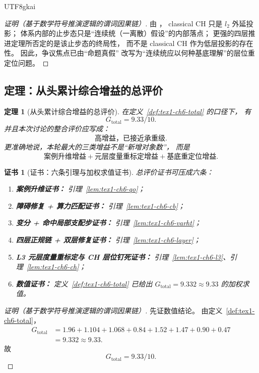 \documentclass[12pt]{article}
\newtheorem{theorem}{定理}[section]
\newtheorem{Certificate}{证书}[section]
\begin{document}
\begin{CJK*}{UTF8}{gkai}
\begin{proof}[证明（基于数学符号推演逻辑的谓词因果链）]
由 \cite{RepoTex41HomotopyRepairBundle}，
classical CH 只是 \(l_2\) 外延投影；
体系内部的止步态只是“连续统（一离散）假设”的内部落点；
更强的四层推进定理所否定的是该止步态的终局性，
而不是 classical CH 作为低层投影的存在性。
因此，争议焦点已由“命题真假”
改写为“连续统应以何种基底理解”的层位重定位问题。
\end{proof}

\subsection{定理：从头累计综合增益的总评价}
\label{subsec:tex1-ch6-theorem}

\begin{theorem}[从头累计综合增益的总评价]
\label{thm:tex1-ch6-total}
在定义~\ref{def:tex1-ch6-total} 的口径下，
有
\[
  \boxed{G_{\mathrm{total}}=9.33/10}.
\]
并且本次讨论的整合评价应写成：
\[
  \boxed{\text{高增益，已接近承重级}.}
\]
更准确地说，本轮最大的三类增益不是“新增对象数”，
而是
\[
  \boxed{
    \text{案例升维增益}
    +
    \text{元层度量重标定增益}
    +
    \text{基底重定位增益}
  }.
\]
\end{theorem}

\begin{Certificate}[证书：六条引理与加权求值证书]
\label{cert:tex1-ch6-total}
总评价证书可压成六条：
\begin{enumerate}
  \item \textbf{案例升维证书：} 引理~\ref{lem:tex1-ch6-qo}；
  \item \textbf{障碍修复 + 算力匹配证书：} 引理~\ref{lem:tex1-ch6-cb}；
  \item \textbf{变分 + 命中局部支配步证书：} 引理~\ref{lem:tex1-ch6-varht}；
  \item \textbf{四层正规链 + 双层修复证书：} 引理~\ref{lem:tex1-ch6-layer}；
  \item \textbf{L3 元层度量重标定与 CH 层位钉死证书：} 引理~\ref{lem:tex1-ch6-l3}、引理~\ref{lem:tex1-ch6-ch}；
  \item \textbf{数值证书：} 定义~\ref{def:tex1-ch6-total} 已给出
  \(G_{\mathrm{total}}=9.332\approx 9.33\) 的加权求值。
\end{enumerate}
\end{Certificate}

\begin{proof}[证明（基于数学符号推演逻辑的谓词因果链）]
先证数值结论。
由定义~\ref{def:tex1-ch6-total}，
\[
\begin{aligned}
  G_{\mathrm{total}}
  &=1.96+1.104+1.068+0.84+1.52+1.47+0.90+0.47 \\
  &=9.332 \approx 9.33.
\end{aligned}
\]
故
\[
  G_{\mathrm{total}}=9.33/10.
\]


\end{proof}
\end{CJK*}
\end{document}
